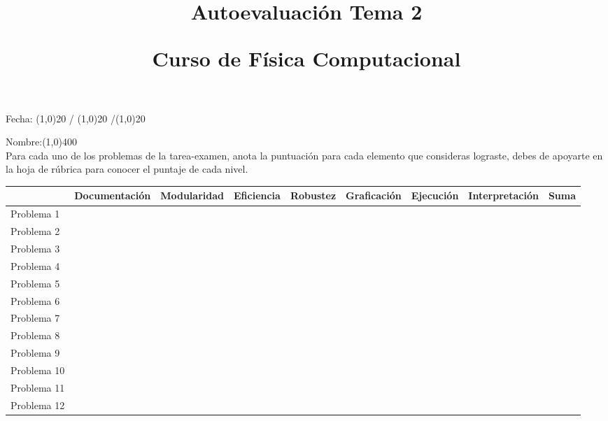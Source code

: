 \documentclass[landscape]{article}
\title{Autoevaluación Tema 2 \\ \begin{large}Curso de Física Computacional\end{large}}
\date{ }
\begin{document}
\maketitle
\fontsize{12}{12}\selectfont
{}
\begin{flushright}
Fecha: \line(1,0){20} / \line(1,0){20} /\line(1,0){20}
\end{flushright}
Nombre:\line(1,0){400}
\\
Para cada uno de los problemas de la tarea-examen, anota la puntuación para cada elemento que consideras lograste, debes de apoyarte en la hoja de rúbrica para conocer el puntaje de cada nivel.
\fontsize{12}{12}\selectfont
\begin{center}
\renewcommand{\arraystretch}{2.3}
\begin{tabular}{| l | c | c | c | c | c | c | c | c |}
\hline
 & Documentación & Modularidad & Eficiencia & Robustez & Graficación & Ejecución & Interpretación & Suma \\ \hline
Problema 1 & & & & & & & & \\ \hline
Problema 2 & & & & & & & & \\ \hline
Problema 3 & & & & & & & & \\ \hline
Problema 4 & & & & & & & & \\ \hline
Problema 5 & & & & & & & & \\ \hline
Problema 6 & & & & & & & & \\ \hline
Problema 7 & & & & & & & & \\ \hline
Problema 8 & & & & & & & & \\ \hline
Problema 9 & & & & & & & & \\ \hline
Problema 10 & & & & & & & & \\ \hline
Problema 11 & & & & & & & & \\ \hline
Problema 12 & & & & & & & & \\ \hline
\end{tabular}
\end{center}
\end{document}
